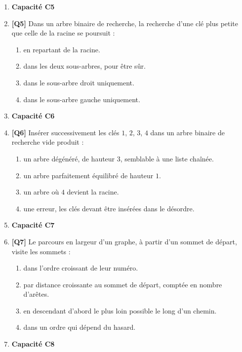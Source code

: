 \begin{enumerate}
\item[] \textbf{Capacité C5}

\item \textbf{[Q5]} Dans un arbre binaire de recherche, la recherche d'une clé plus petite que celle de la racine se poursuit :
  \begin{enumerate}[label=\Alph*.]
    \item en repartant de la racine.
    \item dans les deux sous-arbres, pour être sûr.
    \item dans le sous-arbre droit uniquement.
    \item dans le sous-arbre gauche uniquement.
  \end{enumerate}

\item[] \textbf{Capacité C6}

\item \textbf{[Q6]} Insérer successivement les clés $1$, $2$, $3$, $4$ dans un arbre binaire de recherche vide produit :
  \begin{enumerate}[label=\Alph*.]
    \item un arbre dégénéré, de hauteur $3$, semblable à une liste chaînée.
    \item un arbre parfaitement équilibré de hauteur $1$.
    \item un arbre où $4$ devient la racine.
    \item une erreur, les clés devant être insérées dans le désordre.
  \end{enumerate}

\item[] \textbf{Capacité C7}

\item \textbf{[Q7]} Le parcours en largeur d'un graphe, à partir d'un sommet de départ, visite les sommets :
  \begin{enumerate}[label=\Alph*.]
    \item dans l'ordre croissant de leur numéro.
    \item par distance croissante au sommet de départ, comptée en nombre d'arêtes.
    \item en descendant d'abord le plus loin possible le long d'un chemin.
    \item dans un ordre qui dépend du hasard.
  \end{enumerate}

\item[] \textbf{Capacité C8}


\end{enumerate}
